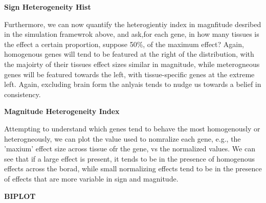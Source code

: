 \textbf{Sign Heterogeneity Hist}

Furthermore, we can now quantify the heterogientiy index in magnfitude desribed in the simulation framewrok above, and ask,for each gene, in how many tissues is the effect a certain  proportion, suppose 50\%, of the maximum effect? Again, homogenous genes will tend to be featured at the right of the distribution, with the majoirty of their tissues effect sizes similar in magnitude, while meterogneous genes will be featured towards the left, with tissue-specific genes at the extreme left. Again, excluding brain form the anlyais tends to nudge us towards a belief in consistency. 

\textbf{Magnitude Heterogeneity Index}

Attempting to understand which genes tend to behave the most homogenously or heterogneously, we can plot the value used to nomralize each gene, e.g., the 'maxium' effect size across tissue ofr the gene, vs the normalized values. We can see that if a large effect is present, it tends to be in the presence of homogenous effects across the borad, while small normalizing effects tend to be in the presence of effects that are more variable in sign and magnitude. 

\textbf{BIPLOT}


\begin{table}[htbp]
\caption{Heterogeneity Comparison}
\centering
{}
\label{table:nonlin}
\end{table}


